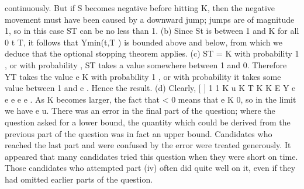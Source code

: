 continuously. But if S becomes negative before hitting K, then the
negative movement must have been caused by a downward jump;
jumps are of magnitude 1, so in this case ST can be no less than 1.
(b) Since St is between 1 and K for all 0 t T, it follows that Ymin(t,T ) is
bounded above and below, from which we deduce that the optional
stopping theorem applies.
(c) ST = K with probability 1 , or with probability , ST takes a value
somewhere between 1 and 0. Therefore YT takes the value e K with
probability 1 , or with probability it takes some value between 1
and e . Hence the result.
(d) Clearly,
[ ]
1 1
K u K
T
K K
E Y e e e
e e
.
As K becomes larger, the fact that < 0 means that e K 0, so in the
limit we have e u.
There was an error in the final part of the question; where the question asked for a lower
bound, the quantity which could be derived from the previous part of the question was in fact
an upper bound. Candidates who reached the last part and were confused by the error were
treated generously.
It appeared that many candidates tried this question when they were short on time. Those
candidates who attempted part (iv) often did quite well on it, even if they had omitted earlier
parts of the question.
